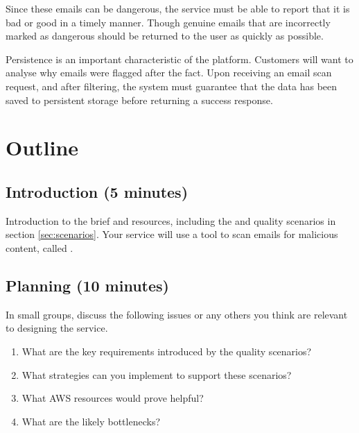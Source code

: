 \documentclass{csse4400}
\begin{document}
Since these emails can be dangerous, the service must be able to report that it is bad or good in a timely manner.
Though genuine emails that are incorrectly marked as dangerous should be returned to the user as quickly as possible.

Persistence is an important characteristic of the platform.
Customers will want to analyse why emails were flagged after the fact.
Upon receiving an email scan request, and after filtering,
the system must guarantee that the data has been saved to persistent storage before returning a success response.


\section{Outline}

\subsection*{Introduction (5 minutes)}
Introduction to the brief and resources,
including the 
and quality scenarios in section \ref{sec:scenarios}.
Your service will use a tool to scan emails for malicious content,
called .

\subsection*{Planning (10 minutes)}
In small groups, discuss the following issues or any others you think are relevant to designing the service.

\begin{enumerate}
    \item What are the key requirements introduced by the quality scenarios?
    \item What strategies can you implement to support these scenarios?
    \item What AWS resources would prove helpful?
    \item What are the likely bottlenecks?
\end{enumerate}
\end{document}
